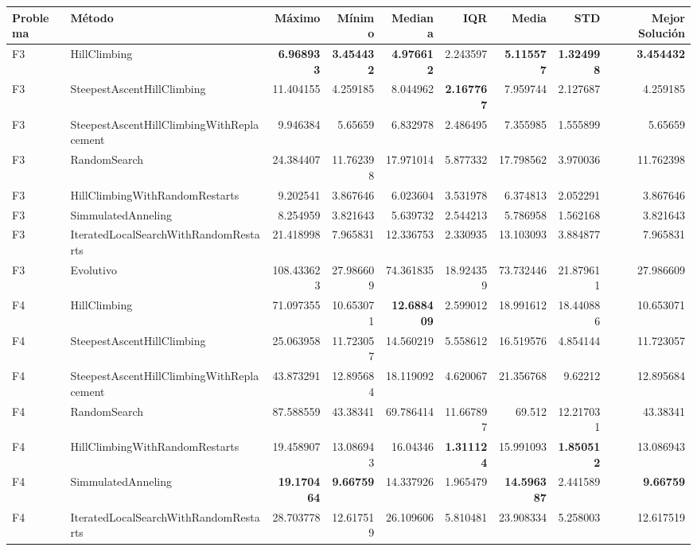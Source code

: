 \begin{tabular}{llrrrrrrr}
\toprule
Problema & Método & Máximo & Mínimo & Mediana & IQR & Media & STD & Mejor Solución \\ 
\midrule
F3 & HillClimbing & \textbf{6.968933} & \textbf{3.454432} & \textbf{4.976612} & 2.243597 & \textbf{5.115577} & \textbf{1.324998} & \textbf{3.454432} \\ 
F3 & SteepestAscentHillClimbing & 11.404155 & 4.259185 & 8.044962 & \textbf{2.167767} & 7.959744 & 2.127687 & 4.259185 \\ 
F3 & SteepestAscentHillClimbingWithReplacement & 9.946384 & 5.65659 & 6.832978 & 2.486495 & 7.355985 & 1.555899 & 5.65659 \\ 
F3 & RandomSearch & 24.384407 & 11.762398 & 17.971014 & 5.877332 & 17.798562 & 3.970036 & 11.762398 \\ 
F3 & HillClimbingWithRandomRestarts & 9.202541 & 3.867646 & 6.023604 & 3.531978 & 6.374813 & 2.052291 & 3.867646 \\ 
F3 & SimmulatedAnneling & 8.254959 & 3.821643 & 5.639732 & 2.544213 & 5.786958 & 1.562168 & 3.821643 \\ 
F3 & IteratedLocalSearchWithRandomRestarts & 21.418998 & 7.965831 & 12.336753 & 2.330935 & 13.103093 & 3.884877 & 7.965831 \\ 
F3 & Evolutivo & 108.433623 & 27.986609 & 74.361835 & 18.924359 & 73.732446 & 21.879611 & 27.986609 \\ 
\midrule
F4 & HillClimbing & 71.097355 & 10.653071 & \textbf{12.688409} & 2.599012 & 18.991612 & 18.440886 & 10.653071 \\ 
F4 & SteepestAscentHillClimbing & 25.063958 & 11.723057 & 14.560219 & 5.558612 & 16.519576 & 4.854144 & 11.723057 \\ 
F4 & SteepestAscentHillClimbingWithReplacement & 43.873291 & 12.895684 & 18.119092 & 4.620067 & 21.356768 & 9.62212 & 12.895684 \\ 
F4 & RandomSearch & 87.588559 & 43.38341 & 69.786414 & 11.667897 & 69.512 & 12.217031 & 43.38341 \\ 
F4 & HillClimbingWithRandomRestarts & 19.458907 & 13.086943 & 16.04346 & \textbf{1.311124} & 15.991093 & \textbf{1.850512} & 13.086943 \\ 
F4 & SimmulatedAnneling & \textbf{19.170464} & \textbf{9.66759} & 14.337926 & 1.965479 & \textbf{14.596387} & 2.441589 & \textbf{9.66759} \\ 
F4 & IteratedLocalSearchWithRandomRestarts & 28.703778 & 12.617519 & 26.109606 & 5.810481 & 23.908334 & 5.258003 & 12.617519 \\ 

\end{tabular}
